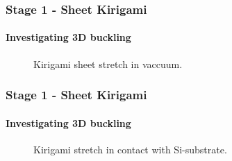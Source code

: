 \documentclass[
	10pt, %
]{beamer}
\begin{document}
\begin{frame}
	\frametitle{Stage 1 - Sheet Kirigami}
	\framesubtitle{Investigating 3D buckling}
	\begin{figure}
		\centering    
		\caption{Kirigami sheet stretch in vaccuum.}
	\end{figure} 
\end{frame}


\begin{frame}
	\frametitle{Stage 1 - Sheet Kirigami}
	\framesubtitle{Investigating 3D buckling}
	\begin{figure}
		\centering    
		\caption{Kirigami stretch in contact with Si-substrate.}
	\end{figure} 
\end{frame}
\end{document}

